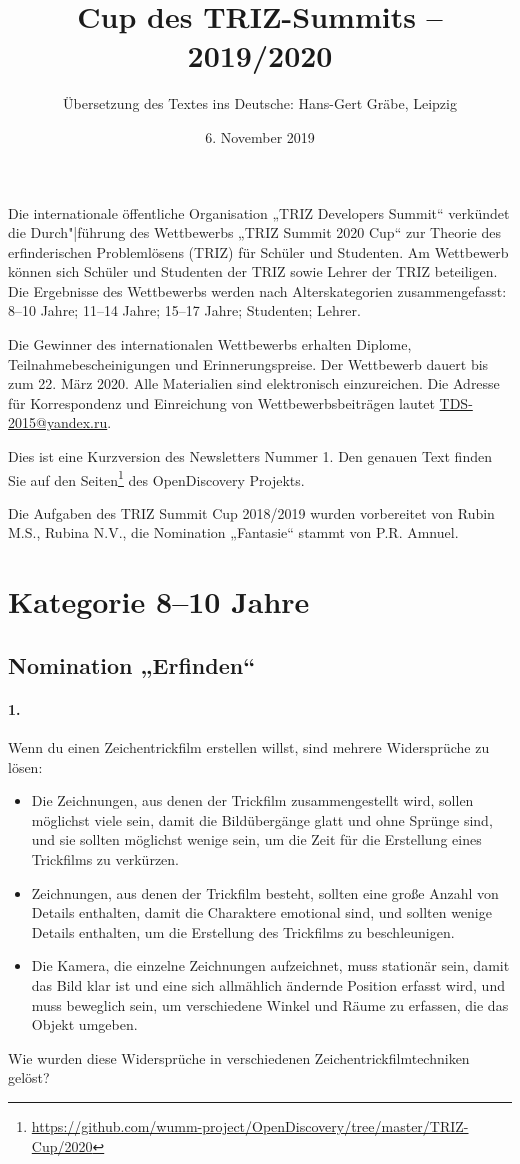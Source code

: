 \documentclass[11pt,a4paper]{article}
\title{Cup des TRIZ-Summits – 2019/2020}
\author{Übersetzung des Textes ins Deutsche: Hans-Gert Gr\"abe, Leipzig}
\date{6. November 2019}
\newcommand{\credentials}{Die Aufgaben des TRIZ Summit Cup 2018/2019 wurden
  vorbereitet von Rubin M.S., Rubina N.V., die Nomination „Fantasie“ stammt
  von P.R. Amnuel.}
\begin{document}
\maketitle

Die internationale öffentliche Organisation „TRIZ Developers Summit“ verkündet
die Durch"|führung des Wettbewerbs „TRIZ Summit 2020 Cup“ zur Theorie des
erfinderischen Problemlösens (TRIZ) für Schüler und Studenten. Am Wettbewerb
können sich Schüler und Studenten der TRIZ sowie Lehrer der TRIZ beteiligen.
Die Ergebnisse des Wettbewerbs werden nach Alterskategorien zusammengefasst:
8--10 Jahre; 11--14 Jahre; 15--17 Jahre; Studenten; Lehrer.

Die Gewinner des internationalen Wettbewerbs erhalten Diplome,
Teilnahmebescheinigungen und Erinnerungspreise. Der Wettbewerb dauert bis zum
22. März 2020. Alle Materialien sind elektronisch einzureichen. Die Adresse
für Korrespondenz und Einreichung von Wettbewerbsbeiträgen lautet
\url{TDS-2015@yandex.ru}.

Dies ist eine Kurzversion des Newsletters Nummer 1. Den genauen Text finden
Sie auf den
Seiten\footnote{\url{https://github.com/wumm-project/OpenDiscovery/tree/master/TRIZ-Cup/2020}}
des OpenDiscovery Projekts.

\credentials
\vfill
\tableofcontents
\vfill
\clearpage
\section{Kategorie 8--10 Jahre}

\subsection*{Nomination „Erfinden“}

\paragraph {1.}
Wenn du einen Zeichentrickfilm erstellen willst, sind mehrere Widersprüche zu
lösen:
\begin {itemize}
\item Die Zeichnungen, aus denen der Trickfilm zusammengestellt wird, sollen
  möglichst viele sein, damit die Bildübergänge glatt und ohne Sprünge sind,
  und sie sollten möglichst wenige sein, um die Zeit für die Erstellung eines
  Trickfilms zu verkürzen.
\item Zeichnungen, aus denen der Trickfilm besteht, sollten eine große Anzahl
  von Details enthalten, damit die Charaktere emotional sind, und sollten
  wenige Details enthalten, um die Erstellung des Trickfilms zu beschleunigen.
\item Die Kamera, die einzelne Zeichnungen aufzeichnet, muss stationär sein,
  damit das Bild klar ist und eine sich allmählich ändernde Position erfasst
  wird, und muss beweglich sein, um verschiedene Winkel und Räume zu erfassen,
  die das Objekt umgeben.
\end{itemize}
Wie wurden diese Widersprüche in verschiedenen Zeichentrickfilmtechniken
gelöst?
\end{document}
